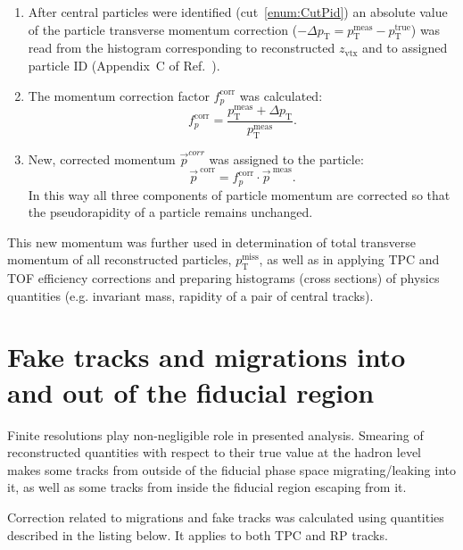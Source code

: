 \begin{enumerate}
	\item After central particles were identified (cut~\ref{enum:CutPid}) an absolute value of the particle transverse momentum correction ($-\Delta p_{\text{T}} = p_{\text{T}}^{\text{meas}}-p_{\text{T}}^{\text{true}}$) was read from the histogram corresponding to reconstructed $z_{\text{vtx}}$ and to assigned particle ID (Appendix~C of Ref.~\cite{supplementaryNote}).
	\item The momentum correction factor $f_{p}^{\text{corr}}$ was calculated:
	\begin{equation}\label{eq:pCorrFactor}
 f_{p}^{\text{corr}} = \frac{p_{\text{T}}^{\text{meas}} + \Delta p_{\text{T}}}{p_{\text{T}}^{\text{meas}}}.
  \end{equation}
  \item New, corrected momentum $\vec{p}^{corr}$ was assigned to the particle:
  \begin{equation}
   \vec{p}^{~\text{corr}} = f_{p}^{\text{corr}} \cdot \vec{p}^{~\text{meas}}.
  \end{equation}
  In this way all three components of particle momentum are corrected so that the pseudorapidity of a particle remains unchanged.
\end{enumerate}
This new momentum was further used in determination of total transverse momentum of all reconstructed particles, $p_{\text{T}}^{\text{miss}}$, as well as in applying TPC and TOF efficiency corrections and preparing histograms (cross sections) of physics quantities (e.g. invariant mass, rapidity of a pair of central tracks).



\section{Fake tracks and migrations into and out of the fiducial region}\label{sec:migrations}

Finite resolutions play non-negligible role in presented analysis. Smearing of reconstructed quantities with respect to their true value at the hadron level makes some tracks from outside of the fiducial phase space migrating/leaking into it, as well as some tracks from inside the fiducial region escaping from it.

Correction related to migrations and fake tracks was calculated using quantities described in the listing below. It applies to both TPC and RP tracks.

